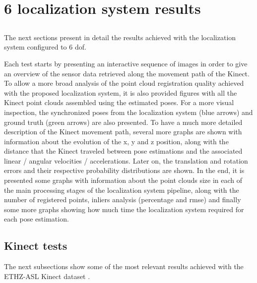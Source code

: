 \chapter{6  localization system results} \label{app:appendix-b}



\section*{}

The next sections present in detail the results achieved with the localization system configured to 6 \gls{dof}.

Each test starts by presenting an interactive sequence of images in order to give an overview of the sensor data retrieved along the movement path of the Kinect. To allow a more broad analysis of the point cloud registration quality achieved with the proposed localization system, it is also provided figures with all the Kinect point clouds assembled using the estimated poses. For a more visual inspection, the synchronized poses from the localization system (blue arrows) and ground truth (green arrows) are also presented. To have a much more detailed description of the Kinect movement path, several more graphs are shown with information about the evolution of the x, y and z position, along with the distance that the Kinect traveled between pose estimations and the associated linear / angular velocities / accelerations. Later on, the translation and rotation errors and their respective probability distributions are shown. In the end, it is presented some graphs with information about the point clouds size in each of the main processing stages of the localization system pipeline, along with the number of registered points, inliers analysis (percentage and \gls{rmse}) and finally some more graphs showing how much time the localization system required for each pose estimation.


\clearpage
\section{Kinect tests}

The next subsections show some of the most relevant results achieved with the ETHZ-ASL Kinect dataset \cite{Pomerleau2011}.



